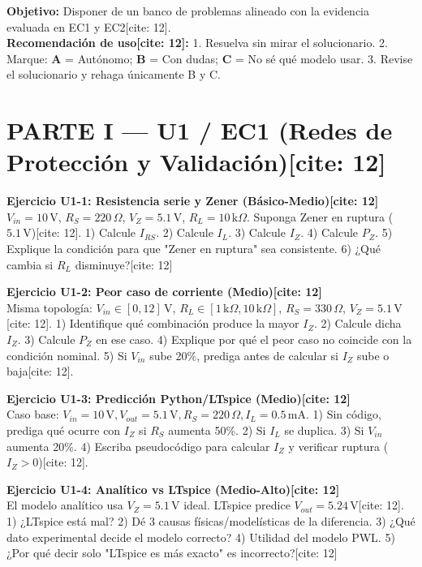 \documentclass[11pt, a4paper]{article}
\begin{document}
\begin{tcolorbox}[colback=ucbblue!5, colframe=ucbblue, title=\textbf{Práctica Asíncrona Ampliada (Recuperatorio U1 + U2)[cite: 12]}]
    \textbf{Objetivo:} Disponer de un banco de problemas alineado con la evidencia evaluada en EC1 y EC2[cite: 12]. \\
    \textbf{Recomendación de uso[cite: 12]:}
    1. Resuelva sin mirar el solucionario.
    2. Marque: \textbf{A} = Autónomo; \textbf{B} = Con dudas; \textbf{C} = No sé qué modelo usar.
    3. Revise el solucionario y rehaga únicamente B y C.
\end{tcolorbox}

\section*{PARTE I — U1 / EC1 (Redes de Protección y Validación)[cite: 12]}

\textbf{Ejercicio U1-1: Resistencia serie y Zener (Básico-Medio)[cite: 12]} \\
$V_{in}=10\,\text{V}$, $R_S=220\,\Omega$, $V_Z=5.1\,\text{V}$, $R_L=10\,\text{k}\Omega$. Suponga Zener en ruptura ($5.1\,\text{V}$)[cite: 12].
1) Calcule $I_{RS}$. 2) Calcule $I_L$. 3) Calcule $I_Z$. 4) Calcule $P_Z$. 5) Explique la condición para que "Zener en ruptura" sea consistente. 6) ¿Qué cambia si $R_L$ disminuye?[cite: 12]

\vspace{0.2cm}
\textbf{Ejercicio U1-2: Peor caso de corriente (Medio)[cite: 12]} \\
Misma topología: $V_{in} \in [0, 12]\,\text{V}$, $R_L \in [1\,\text{k}\Omega, 10\,\text{k}\Omega]$, $R_S=330\,\Omega$, $V_Z=5.1\,\text{V}$[cite: 12].
1) Identifique qué combinación produce la mayor $I_Z$. 2) Calcule dicha $I_Z$. 3) Calcule $P_Z$ en ese caso. 4) Explique por qué el peor caso no coincide con la condición nominal. 5) Si $V_{in}$ sube 20\%, prediga antes de calcular si $I_Z$ sube o baja[cite: 12].

\vspace{0.2cm}
\textbf{Ejercicio U1-3: Predicción Python/LTspice (Medio)[cite: 12]} \\
Caso base: $V_{in}=10\,\text{V}, V_{out}=5.1\,\text{V}, R_S=220\,\Omega, I_L=0.5\,\text{mA}$.
1) Sin código, prediga qué ocurre con $I_Z$ si $R_S$ aumenta 50\%. 2) Si $I_L$ se duplica. 3) Si $V_{in}$ aumenta 20\%. 4) Escriba pseudocódigo para calcular $I_Z$ y verificar ruptura ($I_Z > 0$)[cite: 12].

\vspace{0.2cm}
\textbf{Ejercicio U1-4: Analítico vs LTspice (Medio-Alto)[cite: 12]} \\
El modelo analítico usa $V_Z=5.1\,\text{V}$ ideal. LTspice predice $V_{out}=5.24\,\text{V}$[cite: 12].
1) ¿LTspice está mal? 2) Dé 3 causas físicas/modelísticas de la diferencia. 3) ¿Qué dato experimental decide el modelo correcto? 4) Utilidad del modelo PWL. 5) ¿Por qué decir solo "LTspice es más exacto" es incorrecto?[cite: 12]
\end{document}
